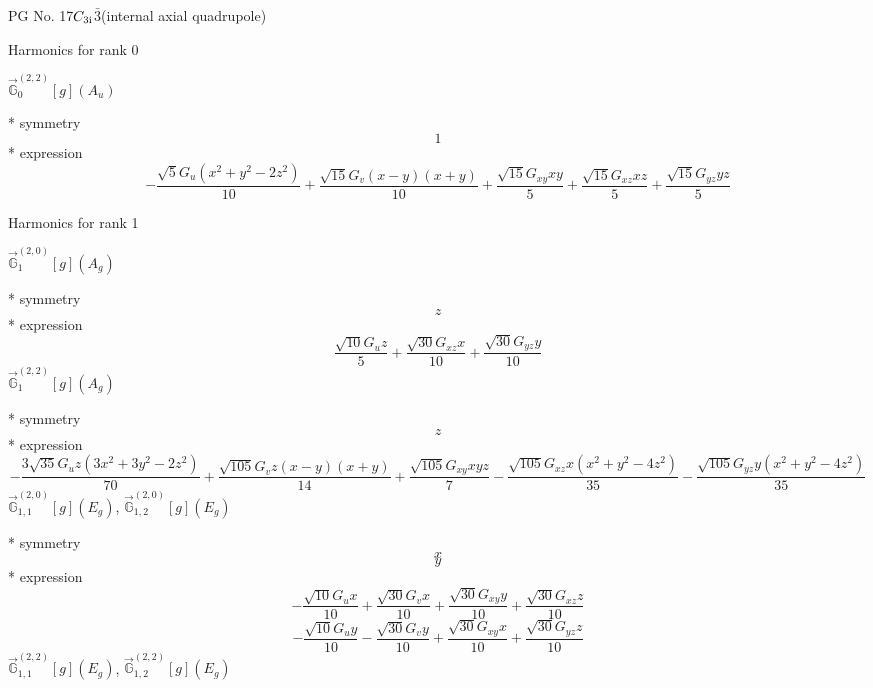 \documentclass[fleqn,8pt]{jsarticle}
\begin{document}
\setcounter{MaxMatrixCols}{32}

\renewcommand{\tablename}{Table~}
\renewcommand{\figurename}{Figure~}
\begin{center}
\LARGE
PG No. 17\quad$C_{\rm 3i}$\quad$\bar{3}$\quad[ trigonal ] (internal axial quadrupole)
\end{center}

\noindent * Harmonics for rank 0

\noindent\quad $\vec{\mathbb{G}}_{0}^{(2,2)}[g](A_{u})$

\noindent\quad ** symmetry
\begin{dmath*}
1
\end{dmath*}
\noindent\quad ** expression
\begin{dmath*}
- \frac{\sqrt{5} G_{u} \left(x^{2} + y^{2} - 2 z^{2}\right)}{10} + \frac{\sqrt{15} G_{v} \left(x - y\right) \left(x + y\right)}{10} + \frac{\sqrt{15} G_{xy} x y}{5} + \frac{\sqrt{15} G_{xz} x z}{5} + \frac{\sqrt{15} G_{yz} y z}{5}
\end{dmath*}

\noindent * Harmonics for rank 1

\noindent\quad $\vec{\mathbb{G}}_{1}^{(2,0)}[g](A_{g})$

\noindent\quad ** symmetry
\begin{dmath*}
z
\end{dmath*}
\noindent\quad ** expression
\begin{dmath*}
\frac{\sqrt{10} G_{u} z}{5} + \frac{\sqrt{30} G_{xz} x}{10} + \frac{\sqrt{30} G_{yz} y}{10}
\end{dmath*}
\noindent\quad $\vec{\mathbb{G}}_{1}^{(2,2)}[g](A_{g})$

\noindent\quad ** symmetry
\begin{dmath*}
z
\end{dmath*}
\noindent\quad ** expression
\begin{dmath*}
- \frac{3 \sqrt{35} G_{u} z \left(3 x^{2} + 3 y^{2} - 2 z^{2}\right)}{70} + \frac{\sqrt{105} G_{v} z \left(x - y\right) \left(x + y\right)}{14} + \frac{\sqrt{105} G_{xy} x y z}{7} - \frac{\sqrt{105} G_{xz} x \left(x^{2} + y^{2} - 4 z^{2}\right)}{35} - \frac{\sqrt{105} G_{yz} y \left(x^{2} + y^{2} - 4 z^{2}\right)}{35}
\end{dmath*}
\noindent\quad $\vec{\mathbb{G}}_{1,1}^{(2,0)}[g](E_{g})$, $\vec{\mathbb{G}}_{1,2}^{(2,0)}[g](E_{g})$

\noindent\quad ** symmetry
\begin{dmath*}
x
\end{dmath*}
\begin{dmath*}
y
\end{dmath*}
\noindent\quad ** expression
\begin{dmath*}
- \frac{\sqrt{10} G_{u} x}{10} + \frac{\sqrt{30} G_{v} x}{10} + \frac{\sqrt{30} G_{xy} y}{10} + \frac{\sqrt{30} G_{xz} z}{10}
\end{dmath*}
\begin{dmath*}
- \frac{\sqrt{10} G_{u} y}{10} - \frac{\sqrt{30} G_{v} y}{10} + \frac{\sqrt{30} G_{xy} x}{10} + \frac{\sqrt{30} G_{yz} z}{10}
\end{dmath*}
\noindent\quad $\vec{\mathbb{G}}_{1,1}^{(2,2)}[g](E_{g})$, $\vec{\mathbb{G}}_{1,2}^{(2,2)}[g](E_{g})$
\end{document}
